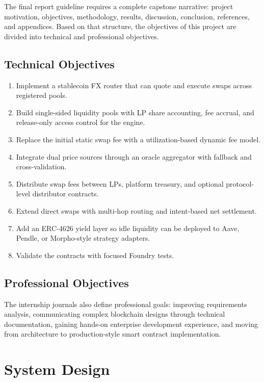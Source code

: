 \documentclass{article}
\begin{document}
The final report guideline requires a complete capstone narrative: project motivation, objectives, methodology, results, discussion, conclusion, references, and appendices. Based on that structure, the objectives of this project are divided into technical and professional objectives.

\subsection{Technical Objectives}

\begin{enumerate}[leftmargin=*]
\item Implement a stablecoin FX router that can quote and execute swaps across registered pools.
\item Build single-sided liquidity pools with LP share accounting, fee accrual, and release-only access control for the engine.
\item Replace the initial static swap fee with a utilization-based dynamic fee model.
\item Integrate dual price sources through an oracle aggregator with fallback and cross-validation.
\item Distribute swap fees between LPs, platform treasury, and optional protocol-level distributor contracts.
\item Extend direct swaps with multi-hop routing and intent-based net settlement.
\item Add an ERC-4626 yield layer so idle liquidity can be deployed to Aave, Pendle, or Morpho-style strategy adapters.
\item Validate the contracts with focused Foundry tests.
\end{enumerate}

\subsection{Professional Objectives}

The internship journals also define professional goals: improving requirements analysis, communicating complex blockchain designs through technical documentation, gaining hands-on enterprise development experience, and moving from architecture to production-style smart contract implementation.

\section{System Design}
\end{document}

